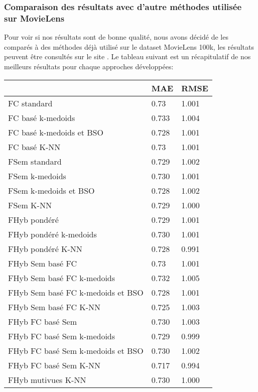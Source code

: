 \subsubsection*{Comparaison des résultats avec d'autre méthodes utilisée sur MovieLens}
Pour voir si nos résultats sont de bonne qualité, nous avons décidé de les comparés à des méthodes déjà utilisé sur le dataset MovieLens 100k, les résultats peuvent être consultés sur le site \cite{ref42}.
Le tableau suivant est un récapitulatif de nos meilleurs résultats pour chaque approches développées:

\begin{table}[H]
	\centering
	\begin{tabular}{|l|l|l|}
		\hline
		& MAE & RMSE \\ \hline
		FC standard & 0.73 & 1.001 \\ \hline
		FC basé k-medoids & 0.733 & 1.004 \\ \hline
		FC basé k-medoids et BSO & 0.728 & 1.001 \\ \hline
		FC basé K-NN & 0.73 & 1.001 \\ \hline
		FSem standard & 0.729 & 1.002 \\ \hline
		FSem k-medoids & 0.730 & 1.001 \\ \hline
		FSem k-medoids et BSO & 0.728 & 1.002 \\ \hline
		FSem K-NN & 0.729 & 1.000 \\ \hline
		FHyb pondéré & 0.729 & 1.001 \\ \hline
		FHyb pondéré k-medoids & 0.730 & 1.001 \\ \hline
		FHyb pondéré K-NN & 0.728 & 0.991 \\ \hline
		FHyb Sem basé FC & 0.73 & 1.001 \\ \hline
		FHyb Sem basé FC k-medoids & 0.732 & 1.005 \\ \hline
		FHyb Sem basé FC k-medoids et BSO & 0.728 & 1.001 \\ \hline
		FHyb Sem basé FC K-NN & 0.725 & 1.003 \\ \hline
		FHyb FC basé Sem & 0.730 & 1.003 \\ \hline
		FHyb FC basé Sem k-medoids & 0.729 & 0.999 \\ \hline
		FHyb FC basé Sem k-medoids et BSO & 0.730 & 1.002 \\ \hline
		FHyb FC basé Sem K-NN & \cellcolor[HTML]{67FD9A}0.717 & \cellcolor[HTML]{67FD9A}0.994 \\ \hline
		FHyb mutivues K-NN & 0.730 & 1.000 \\ \hline
	\end{tabular}
 \label{tab:movie}
\end{table}
